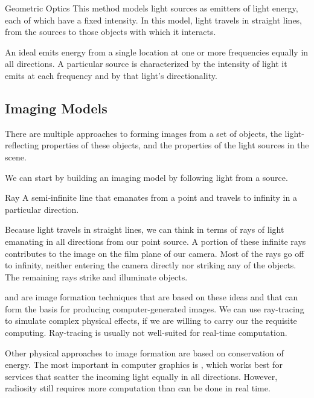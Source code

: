 \documentclass[../COS3712_Notes.tex]{subfiles}
\begin{document}
        \begin{definition}{Geometric Optics}
          This method models light sources as emitters of light energy,
          each of which have a fixed intensity.
          In this model, light travels in straight lines,
          from the sources to those objects with which it interacts.
        \end{definition}

        An ideal  emits energy from a single location
        at one or more frequencies equally in all directions.
        A particular source is characterized by the
        intensity of light it emits at each frequency and
        by that light's directionality.

      \subsection{Imaging Models}
        There are multiple approaches to forming images from a set of objects,
        the light-reflecting properties of these objects, and
        the properties of the light sources in the scene.

        We can start by building an imaging model by following light from a source.

        \begin{definition}{Ray}
          A semi-infinite line that emanates from a point and
          travels to infinity in a particular direction.
        \end{definition}

        Because light travels in straight lines, we can think in terms of rays of light
        emanating in all directions from our point source.
        A portion of these infinite rays contributes to the image on the film plane of our camera.
        Most of the rays go off to infinity, neither entering the camera directly nor striking any
        of the objects.
        The remaining rays strike and illuminate objects.

         and  are image formation techniques
        that are based on these ideas and that can form the basis for producing computer-generated
        images.
        We can use ray-tracing to simulate complex physical effects,
        if we are willing to carry our the requisite computing.
        Ray-tracing is usually not well-suited for real-time computation.

        Other physical approaches to image formation are based on conservation of energy.
        The most important in computer graphics is ,
        which works best for services that scatter the incoming light equally in all directions.
        However, radiosity still requires more computation than can be done in real time.
\end{document}
